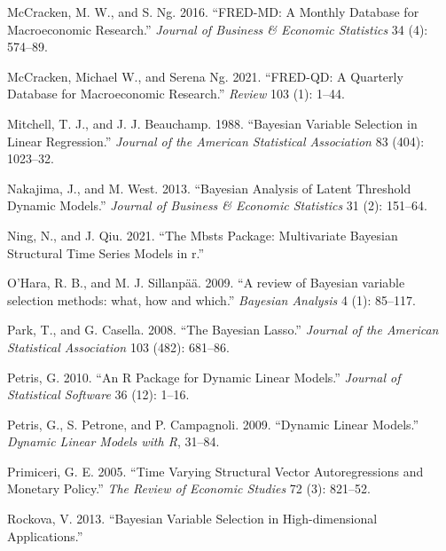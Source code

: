 \documentclass[
  12pt,
]{book}
\newlength{\cslhangindent}
\newlength{\cslentryspacingunit} %
\newenvironment{CSLReferences}[2] %
 {%
  \setlength{\parindent}{0pt}
  \ifodd #1
  \let\oldpar\par
  \def\par{\hangindent=\cslhangindent\oldpar}
  \fi
  \setlength{\parskip}{#2\cslentryspacingunit}
 }%
 {}
\theoremstyle{break}
\theoremstyle{nonumberplain}
\begin{document}
\begin{CSLReferences}{1}{0}
\leavevmode{}%
McCracken, M. W., and S. Ng. 2016. {``{FRED-MD: A Monthly Database for
Macroeconomic Research}.''} \emph{Journal of Business \& Economic
Statistics} 34 (4): 574--89.

\leavevmode{}%
McCracken, Michael W., and Serena Ng. 2021. {``{FRED-QD: A Quarterly
Database for Macroeconomic Research}.''} \emph{Review} 103 (1): 1--44.

\leavevmode{}%
Mitchell, T. J., and J. J. Beauchamp. 1988. {``Bayesian Variable
Selection in Linear Regression.''} \emph{Journal of the American
Statistical Association} 83 (404): 1023--32.

\leavevmode{}%
Nakajima, J., and M. West. 2013. {``Bayesian Analysis of Latent
Threshold Dynamic Models.''} \emph{Journal of Business \& Economic
Statistics} 31 (2): 151--64.

\leavevmode{}%
Ning, N., and J. Qiu. 2021. {``The Mbsts Package: Multivariate Bayesian
Structural Time Series Models in r.''}

\leavevmode{}%
O'Hara, R. B., and M. J. Sillanpää. 2009. {``{A review of Bayesian
variable selection methods: what, how and which}.''} \emph{Bayesian
Analysis} 4 (1): 85--117.

\leavevmode{}%
Park, T., and G. Casella. 2008. {``The Bayesian Lasso.''} \emph{Journal
of the American Statistical Association} 103 (482): 681--86.

\leavevmode{}%
Petris, G. 2010. {``An {R} Package for Dynamic Linear Models.''}
\emph{Journal of Statistical Software} 36 (12): 1--16.

\leavevmode{}%
Petris, G., S. Petrone, and P. Campagnoli. 2009. {``Dynamic Linear
Models.''} \emph{Dynamic Linear Models with R}, 31--84.

\leavevmode{}%
Primiceri, G. E. 2005. {``Time Varying Structural Vector Autoregressions
and Monetary Policy.''} \emph{The Review of Economic Studies} 72 (3):
821--52.

\leavevmode{}%
Rockova, V. 2013. {``{Bayesian Variable Selection in High-dimensional
Applications}.''}


\end{CSLReferences}
\end{document}
